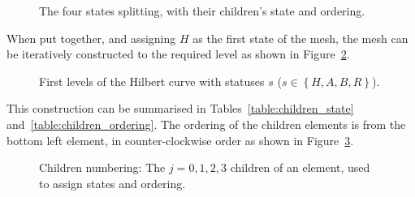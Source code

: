 \begin{figure}[H]
	\centering
	\hfill
	\hfill
	\hfill
	\caption{The four states splitting, with their children's state and ordering.}\label{fig:hilbert_splits}
\end{figure}

\noindent
When put together, and assigning \(H\) as the first state of the mesh, the mesh can be iteratively
constructed to the required level as shown in Figure~\ref{fig:hilbert_levels}.

\begin{figure}[H]
	\centering
	\subfloat[Level 0]
	{\label{fig:hilbert_l0}}
	\hfill
	\subfloat[Level 1]
	{\label{fig:hilbert_l1}}
	\hfill
	\subfloat[Level 2]
	{\label{fig:hilbert_l2}}
	\caption{First levels of the Hilbert curve with statuses \(s\) (\(s \in \left \{ H, A , B , R \right \} \)).}\label{fig:hilbert_levels}
\end{figure}

\noindent
This construction can be summarised in Tables~\ref{table:children_state}
and~\ref{table:children_ordering}. The ordering of the children elements is from the bottom left
element, in counter-clockwise order as shown in Figure~\ref{fig:child_order}. 

\begin{figure}[H]
	\centering
	
	\caption{Children numbering: The \(j = 0, 1, 2, 3\) children of an element, used to assign states and ordering.}\label{fig:child_order}
\end{figure}

